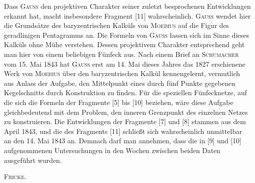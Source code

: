 Dass \textsc{Gauss} den projektiven Charakter seiner zuletzt besprochenen Entwicklungen erkannt hat, macht insbesondere Fragment [11] wahrscheinlich. \textsc{Gauss} wendet hier die Grundsätze des baryzentrischen Kalküls von \textsc{Moebius} auf die Figur des geradlinigen Pentagramms an. Die Formeln von \textsc{Gauss} lassen sich im Sinne dieses Kalküls ohne Mühe verstehen. Dessen projektivem Charakter entsprechend geht man hier von einem beliebigen Fünfeck aus. Nach einem Brief an \textsc{Schumacher} vom 15. Mai 1843 hat \textsc{Gauss} erst am 14. Mai dieses Jahres das 1827 erschienene Werk von \textsc{Moebius} über den baryzentrischen Kalkül kennengelernt, vermutlich aus Anlass der Aufgabe, den Mittelpunkt eines durch fünf Punkte gegebenen Kegelschnitts durch Konstruktion zu finden. Für die speziellen Fünfecknetze, auf die sich die Formeln der Fragmente [5] bis [10] beziehen, wäre diese Aufgabe gleichbedeutend mit dem Problem, den inneren Grenzpunkt des einzelnen Netzes zu konstruieren. Die Entwicklungen der Fragmente [7] und [8] stammen aus dem April 1843, und die des Fragments [11] schließt sich wahrscheinlich unmittelbar an den 14. Mai 1843 an. Demnach darf man annehmen, dass die in [9] und [10] aufgenommenen Untersuchungen in den Wochen zwischen beiden Daten ausgeführt wurden.

\hfill\textsc{Fricke}.

\noindent\hrulefill\par
